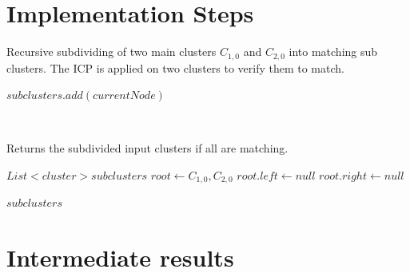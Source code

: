 \documentclass[notitlepage,english]{hgbreport}
\begin{document}
	\section{Implementation Steps}
	
	\begin{algorithm}[tbp]
		\caption{Recursive subdividing of two main clusters $C_{1,0}$ and $C_{2,0}$ into matching sub clusters. The ICP is applied on two clusters to verify them to match.}
		\label{alg:clustering}
		
		\begin{algorithmic}[1]     %
			
			\State $subclusters.add(currentNode)$
			
			\Else
			\State {}
			\State {}
			\State {}
			
			\EndIf
			\\
			
			\EndProcedure	
			
			
			\Statex Returns the subdivided input clusters if all are matching.
			
						\State $List<cluster> subclusters$
						\State $root \gets C_{1,0}, C_{2,0}$
						\State $root.left \gets null$
						\State $root.right \gets null$
						
						
						\State\Return $\mathit{subclusters}$
			
			\EndProcedure
		\end{algorithmic}
	\end{algorithm}
	
	\section{Intermediate results}
	
\end{document}
